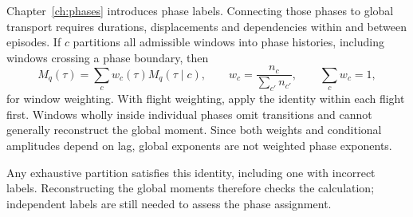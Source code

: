 Chapter~\ref{ch:phases} introduces phase labels. Connecting those phases to global
transport requires durations, displacements and dependencies within and between
episodes. If $c$ partitions all admissible windows into phase histories, including
windows crossing a phase boundary, then
\begin{equation}
  M_q(\tau)=\sum_c w_c(\tau)M_q(\tau\mid c),\qquad
  w_c=\frac{n_c}{\sum_{c'}n_{c'}},\qquad \sum_cw_c=1,
  \label{eq:phase-reconstruction}
\end{equation}
for window weighting. With flight weighting, apply the identity within each
flight first. Windows wholly inside individual phases omit transitions and
cannot generally reconstruct the global moment. Since both weights and conditional
amplitudes depend on lag, global exponents are not weighted phase exponents.

Any exhaustive partition satisfies this identity, including one with incorrect labels.
Reconstructing the global moments therefore checks the calculation; independent labels
are still needed to assess the phase assignment.
